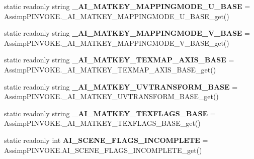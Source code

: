 \begin{DoxyCompactItemize}
\item 
\hypertarget{class_assimp_abd7694455580cde683d6ff9000c0ce94}{static readonly string {\bfseries \+\_\+\+A\+I\+\_\+\+M\+A\+T\+K\+E\+Y\+\_\+\+M\+A\+P\+P\+I\+N\+G\+M\+O\+D\+E\+\_\+\+U\+\_\+\+B\+A\+S\+E} = Assimp\+P\+I\+N\+V\+O\+K\+E.\+\_\+\+A\+I\+\_\+\+M\+A\+T\+K\+E\+Y\+\_\+\+M\+A\+P\+P\+I\+N\+G\+M\+O\+D\+E\+\_\+\+U\+\_\+\+B\+A\+S\+E\+\_\+get()}\label{class_assimp_abd7694455580cde683d6ff9000c0ce94}

\item 
\hypertarget{class_assimp_a9cfcaf8a4c567f9638f8b69fd78b6808}{static readonly string {\bfseries \+\_\+\+A\+I\+\_\+\+M\+A\+T\+K\+E\+Y\+\_\+\+M\+A\+P\+P\+I\+N\+G\+M\+O\+D\+E\+\_\+\+V\+\_\+\+B\+A\+S\+E} = Assimp\+P\+I\+N\+V\+O\+K\+E.\+\_\+\+A\+I\+\_\+\+M\+A\+T\+K\+E\+Y\+\_\+\+M\+A\+P\+P\+I\+N\+G\+M\+O\+D\+E\+\_\+\+V\+\_\+\+B\+A\+S\+E\+\_\+get()}\label{class_assimp_a9cfcaf8a4c567f9638f8b69fd78b6808}

\item 
\hypertarget{class_assimp_a072cfaf95bf53175f39c4f7eaa5361a6}{static readonly string {\bfseries \+\_\+\+A\+I\+\_\+\+M\+A\+T\+K\+E\+Y\+\_\+\+T\+E\+X\+M\+A\+P\+\_\+\+A\+X\+I\+S\+\_\+\+B\+A\+S\+E} = Assimp\+P\+I\+N\+V\+O\+K\+E.\+\_\+\+A\+I\+\_\+\+M\+A\+T\+K\+E\+Y\+\_\+\+T\+E\+X\+M\+A\+P\+\_\+\+A\+X\+I\+S\+\_\+\+B\+A\+S\+E\+\_\+get()}\label{class_assimp_a072cfaf95bf53175f39c4f7eaa5361a6}

\item 
\hypertarget{class_assimp_a734495cd273335fbd1b58429c4f6e37a}{static readonly string {\bfseries \+\_\+\+A\+I\+\_\+\+M\+A\+T\+K\+E\+Y\+\_\+\+U\+V\+T\+R\+A\+N\+S\+F\+O\+R\+M\+\_\+\+B\+A\+S\+E} = Assimp\+P\+I\+N\+V\+O\+K\+E.\+\_\+\+A\+I\+\_\+\+M\+A\+T\+K\+E\+Y\+\_\+\+U\+V\+T\+R\+A\+N\+S\+F\+O\+R\+M\+\_\+\+B\+A\+S\+E\+\_\+get()}\label{class_assimp_a734495cd273335fbd1b58429c4f6e37a}

\item 
\hypertarget{class_assimp_a79f2956e27642b8cf17df94e4b32c153}{static readonly string {\bfseries \+\_\+\+A\+I\+\_\+\+M\+A\+T\+K\+E\+Y\+\_\+\+T\+E\+X\+F\+L\+A\+G\+S\+\_\+\+B\+A\+S\+E} = Assimp\+P\+I\+N\+V\+O\+K\+E.\+\_\+\+A\+I\+\_\+\+M\+A\+T\+K\+E\+Y\+\_\+\+T\+E\+X\+F\+L\+A\+G\+S\+\_\+\+B\+A\+S\+E\+\_\+get()}\label{class_assimp_a79f2956e27642b8cf17df94e4b32c153}

\item 
\hypertarget{class_assimp_a9ae3af06a37efaa131d65025fa5f8a73}{static readonly int {\bfseries A\+I\+\_\+\+S\+C\+E\+N\+E\+\_\+\+F\+L\+A\+G\+S\+\_\+\+I\+N\+C\+O\+M\+P\+L\+E\+T\+E} = Assimp\+P\+I\+N\+V\+O\+K\+E.\+A\+I\+\_\+\+S\+C\+E\+N\+E\+\_\+\+F\+L\+A\+G\+S\+\_\+\+I\+N\+C\+O\+M\+P\+L\+E\+T\+E\+\_\+get()}\label{class_assimp_a9ae3af06a37efaa131d65025fa5f8a73}


\end{DoxyCompactItemize}
